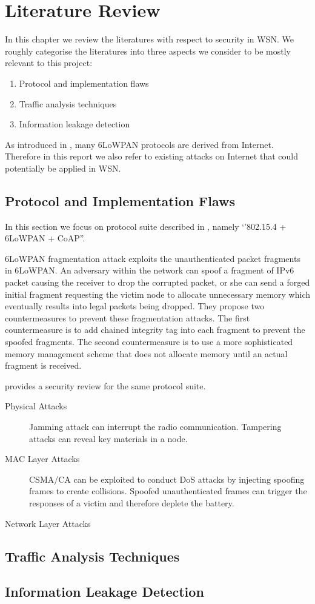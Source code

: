 \chapter{Literature Review} \label{Chp: LiteratureReview}

In this chapter we review the literatures with respect to security in WSN. We roughly categorise the literatures into three aspects we consider to be mostly relevant to this project:

\begin{enumerate}
	\item Protocol and implementation flaws
	\item Traffic analysis techniques
	\item Information leakage detection
\end{enumerate}

As introduced in , many 6LoWPAN protocols are derived from Internet. Therefore in this report we also refer to existing attacks on Internet that could potentially be applied in WSN.

\section{Protocol and Implementation Flaws}

In this section we focus on protocol suite described in , namely `'802.15.4 + 6LoWPAN + CoAP''.

6LoWPAN fragmentation attack\cite{6lpFragAtk} exploits the unauthenticated packet fragments in 6LoWPAN. An adversary within the network can spoof a fragment of IPv6 packet causing the receiver to drop the corrupted  packet, or she can send a forged initial fragment requesting the victim node to allocate unnecessary memory which eventually results into legal packets being dropped. They propose two countermeasures to prevent these fragmentation attacks. The first countermeasure is to add chained integrity tag into each fragment to prevent the spoofed fragments. The second countermeasure is to use a more sophisticated memory management scheme that does not allocate memory until an actual fragment is received.

\cite{6lowpanSec} provides a security review for the same protocol suite.
\begin{description}
	\item[Physical Attacks]
	Jamming attack can interrupt the radio communication. Tampering attacks can reveal key materials in a node.
	\item[MAC Layer Attacks]
	CSMA/CA can be exploited to conduct DoS attacks by injecting spoofing frames to create collisions. Spoofed unauthenticated frames can trigger the responses of a victim and therefore deplete the battery.
	\item[Network Layer Attacks]
\end{description} 

\section{Traffic Analysis Techniques}

\section{Information Leakage Detection}

